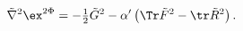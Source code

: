 \begin{equation}
   \tilde\nabla^2\ex^{2\Phi} = -\tfrac{1}{2}\tilde G^2  
     - \alpha'\left( \Tr \tilde F^2 - \tr \tilde R^2\right) .
\end{equation}

